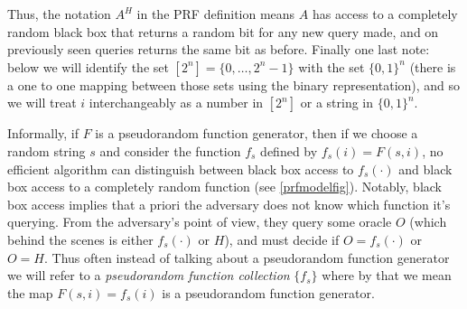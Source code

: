 
Thus, the notation \(A^H\) in the PRF definition means \(A\) has access
to a completely random black box that returns a random bit for any new
query made, and on previously seen queries returns the same bit as
before. Finally one last note: below we will identify the set
\([2^n] = \{0,\ldots,2^n-1\}\) with the set \(\{0,1\}^n\) (there is a
one to one mapping between those sets using the binary representation),
and so we will treat \(i\) interchangeably as a number in \([2^n]\) or a
string in \(\{0,1\}^n\).

Informally, if \(F\) is a pseudorandom function generator, then if we
choose a random string \(s\) and consider the function \(f_s\) defined
by \(f_s(i) = F(s,i)\), no efficient algorithm can distinguish between
black box access to \(f_s(\cdot)\) and black box access to a completely
random function (see \cref{prfmodelfig}). Notably, black box access
implies that a priori the adversary does not know which function it's
querying. From the adversary's point of view, they query some oracle
\(O\) (which behind the scenes is either \(f_s(\cdot)\) or \(H\)), and
must decide if \(O = f_s(\cdot)\) or \(O = H\). Thus often instead of
talking about a pseudorandom function generator we will refer to a
\emph{pseudorandom function collection} \(\{ f_s \}\) where by that we
mean the map \(F(s,i)=f_s(i)\) is a pseudorandom function generator.

